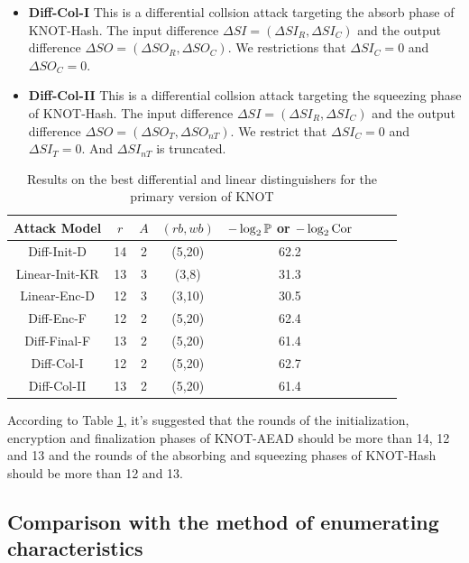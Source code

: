 \begin{itemize}
	\item \textbf{Diff-Col-I} This is a differential collsion attack targeting the absorb phase of KNOT-Hash. The input difference $\Delta SI=(\Delta SI_R,\Delta SI_C)$ and the output difference $\Delta SO=(\Delta SO_R,\Delta SO_C)$. We restrictions that $\Delta SI_C=0$ and $\Delta SO_C=0$. 
	\item \textbf{Diff-Col-II} This is a differential collsion attack targeting the squeezing phase of KNOT-Hash. The input difference $\Delta SI=(\Delta SI_R,\Delta SI_C)$ and the output difference $\Delta SO=(\Delta SO_{T},\Delta SO_{nT})$. We restrict that $\Delta SI_C=0$ and $\Delta SI_{T}=0$. And $\Delta SI_{nT}$ is truncated. 
\end{itemize}

\begin{table}
	\caption{Results on the best differential and linear distinguishers for the primary version of KNOT}\label{tab:knot}
	\centering
	\begin{tabular}{|c|c|c|c|c|c|c|c|}
		\hline
		Attack Model & $r$ & $A$ & $(rb,wb)$ & $-\log_2\mathbb{P}$ or $-\log_2\text{Cor}$\\
		\hline
		Diff-Init-D & 14 & 2 & (5,20) & 62.2 \\
		Linear-Init-KR & 13 & 3 & (3,8) & 31.3 \\%
		Linear-Enc-D & 12 & 3 & (3,10) & 30.5 \\%
		Diff-Enc-F & 12 & 2 & (5,20) & 62.4 \\
		Diff-Final-F & 13 & 2 & (5,20) & 61.4 \\
		Diff-Col-I & 12 & 2 & (5,20) & 62.7 \\
		Diff-Col-II & 13 & 2 & (5,20) & 61.4 \\
		\hline
	\end{tabular}
\end{table}

According to Table \ref{tab:knot}, it's suggested that the rounds of the initialization, encryption and finalization phases of KNOT-AEAD should be more than 14, 12 and 13 and the rounds of the absorbing and squeezing phases of KNOT-Hash should be more than 12 and 13. 

\subsection{Comparison with the method of enumerating characteristics}


